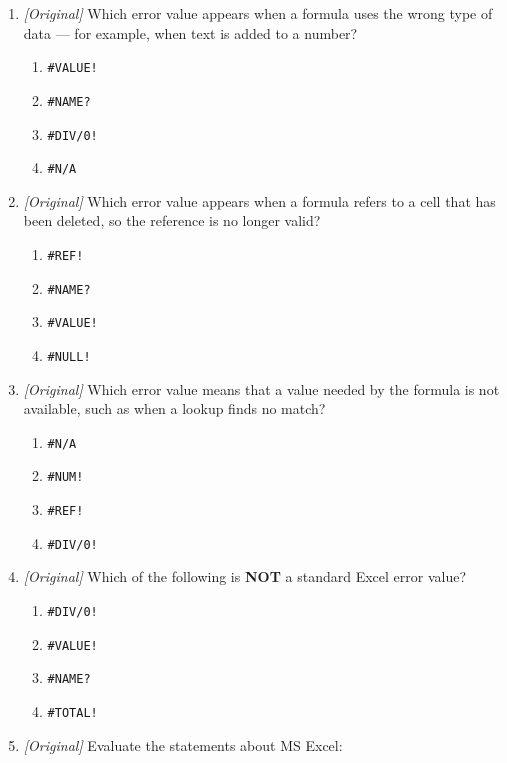 \begin{enumerate}[label=\textbf{Q\arabic*.}, leftmargin=*]
\begin{enumerate}[label=\Alph*.]
    \item \texttt{\#NUM!}
  \end{enumerate}
\item \textit{[Original]} Which error value appears when a formula uses the
  wrong type of data --- for example, when text is added to a number?
  \begin{enumerate}[label=\Alph*.]
    \item \texttt{\#VALUE!}
    \item \texttt{\#NAME?}
    \item \texttt{\#DIV/0!}
    \item \texttt{\#N/A}
  \end{enumerate}
\item \textit{[Original]} Which error value appears when a formula refers to a
  cell that has been deleted, so the reference is no longer valid?
  \begin{enumerate}[label=\Alph*.]
    \item \texttt{\#REF!}
    \item \texttt{\#NAME?}
    \item \texttt{\#VALUE!}
    \item \texttt{\#NULL!}
  \end{enumerate}
\item \textit{[Original]} Which error value means that a value needed by the
  formula is not available, such as when a lookup finds no match?
  \begin{enumerate}[label=\Alph*.]
    \item \texttt{\#N/A}
    \item \texttt{\#NUM!}
    \item \texttt{\#REF!}
    \item \texttt{\#DIV/0!}
  \end{enumerate}
\item \textit{[Original]} Which of the following is \textbf{NOT} a standard
  Excel error value?
  \begin{enumerate}[label=\Alph*.]
    \item \texttt{\#DIV/0!}
    \item \texttt{\#VALUE!}
    \item \texttt{\#NAME?}
    \item \texttt{\#TOTAL!}
  \end{enumerate}
\item \textit{[Original]} Evaluate the statements about MS Excel:
  \begin{enumerate}[label=\Roman*.]

\end{enumerate}
\end{enumerate}
